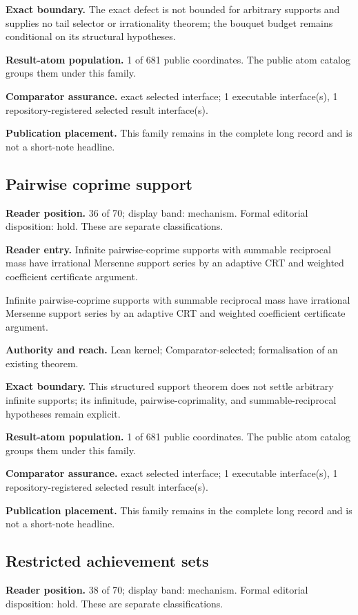 \textbf{Exact boundary.} The exact defect is not bounded for arbitrary supports and supplies no tail selector or irrationality theorem; the bouquet budget remains conditional on its structural hypotheses.

\textbf{Result-atom population.} 1 of 681 public coordinates. The public atom catalog groups them under this family.

\textbf{Comparator assurance.} exact selected interface; 1 executable interface(s), 1 repository-registered selected result interface(s).

\textbf{Publication placement.} This family remains in the complete long record and is not a short-note headline.

\subsection{Pairwise coprime support}
\textbf{Reader position.} 36 of 70; display band: mechanism.  Formal editorial disposition: hold.  These are separate classifications.

\textbf{Reader entry.} Infinite pairwise-coprime supports with summable reciprocal mass have irrational Mersenne support series by an adaptive CRT and weighted coefficient certificate argument.

Infinite pairwise-coprime supports with summable reciprocal mass have irrational Mersenne support series by an adaptive CRT and weighted coefficient certificate argument.

\textbf{Authority and reach.} Lean kernel; Comparator-selected; formalisation of an existing theorem.

\textbf{Exact boundary.} This structured support theorem does not settle arbitrary infinite supports; its infinitude, pairwise-coprimality, and summable-reciprocal hypotheses remain explicit.

\textbf{Result-atom population.} 1 of 681 public coordinates. The public atom catalog groups them under this family.

\textbf{Comparator assurance.} exact selected interface; 1 executable interface(s), 1 repository-registered selected result interface(s).

\textbf{Publication placement.} This family remains in the complete long record and is not a short-note headline.

\subsection{Restricted achievement sets}
\textbf{Reader position.} 38 of 70; display band: mechanism.  Formal editorial disposition: hold.  These are separate classifications.


